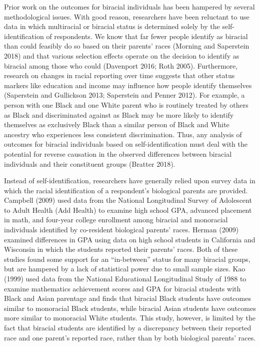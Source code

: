 \documentclass[
  letterpaper,
  DIV=11,
  numbers=noendperiod]{scrartcl}
\begin{document}
Prior work on the outcomes for biracial individuals has been hampered by
several methodological issues. With good reason, researchers have been
reluctant to use data in which multiracial or biracial status is
determined solely by the self-identification of respondents. We know
that far fewer people identify as biracial than could feasibly do so
based on their parents' races (Morning and Saperstein 2018) and that
various selection effects operate on the decision to identify as
biracial among those who could (Davenport 2016; Roth 2005). Furthermore,
research on changes in racial reporting over time suggests that other
status markers like education and income may influence how people
identify themselves (Saperstein and Gullickson 2013; Saperstein and
Penner 2012). For example, a person with one Black and one White parent
who is routinely treated by others as Black and discriminated against as
Black may be more likely to identify themselves as exclusively Black
than a similar person of Black and White ancestry who experiences less
consistent discrimination. Thus, any analysis of outcomes for biracial
individuals based on self-identification must deal with the potential
for reverse causation in the observed differences between biracial
individuals and their constituent groups (Bratter 2018).

Instead of self-identification, researchers have generally relied upon
survey data in which the racial identification of a respondent's
biological parents are provided. Campbell (2009) used data from the
National Longitudinal Survey of Adolescent to Adult Health (Add Health)
to examine high school GPA, advanced placement in math, and four-year
college enrollment among biracial and monoracial individuals identified
by co-resident biological parents' races. Herman (2009) examined
differences in GPA using data on high school students in California and
Wisconsin in which the students reported their parents' races. Both of
these studies found some support for an ``in-between'' status for many
biracial groups, but are hampered by a lack of statistical power due to
small sample sizes. Kao (1999) used data from the National Educational
Longitudinal Study of 1988 to examine mathematics achievement scores and
GPA for biracial students with Black and Asian parentage and finds that
biracial Black students have outcomes similar to monoracial Black
students, while biracial Asian students have outcomes more similar to
monoracial White students. This study, however, is limited by the fact
that biracial students are identified by a discrepancy between their
reported race and one parent's reported race, rather than by both
biological parents' races.
\end{document}
